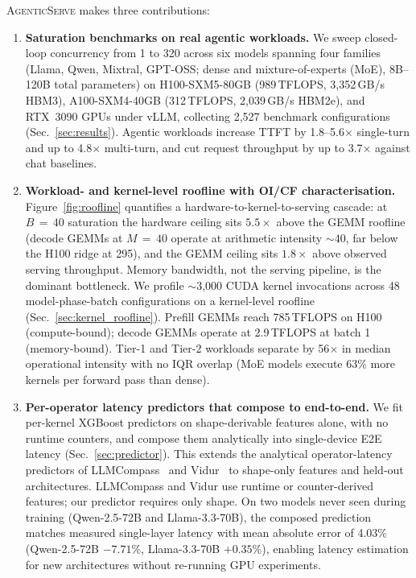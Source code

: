 \textsc{AgenticServe} makes three contributions:

\begin{enumerate}
    \item \textbf{Saturation benchmarks on real agentic workloads.} We sweep closed-loop concurrency from 1 to 320 across six models spanning four families (Llama, Qwen, Mixtral, GPT-OSS; dense and mixture-of-experts (MoE), 8B--120B total parameters) on H100-SXM5-80GB (989\,TFLOPS, 3{,}352\,GB/s HBM3), A100-SXM4-40GB (312\,TFLOPS, 2{,}039\,GB/s HBM2e), and RTX~3090 GPUs under vLLM, collecting 2{,}527 benchmark configurations (Sec.~\ref{sec:results}). Agentic workloads increase TTFT by 1.8--5.6$\times$ single-turn and up to 4.8$\times$ multi-turn, and cut request throughput by up to 3.7$\times$ against chat baselines.
    \item \textbf{Workload- and kernel-level roofline with OI/CF characterisation.} Figure~\ref{fig:roofline} quantifies a hardware-to-kernel-to-serving cascade: at $B\,{=}\,40$ saturation the hardware ceiling sits $5.5\times$ above the GEMM roofline (decode GEMMs at $M\,{=}\,40$ operate at arithmetic intensity ${\sim}40$, far below the H100 ridge at 295), and the GEMM ceiling sits $1.8\times$ above observed serving throughput. Memory bandwidth, not the serving pipeline, is the dominant bottleneck. We profile ${\sim}$3{,}000 CUDA kernel invocations across 48 model-phase-batch configurations on a kernel-level roofline (Sec.~\ref{sec:kernel_roofline}). Prefill GEMMs reach 785\,TFLOPS on H100 (compute-bound); decode GEMMs operate at 2.9\,TFLOPS at batch 1 (memory-bound). Tier-1 and Tier-2 workloads separate by 56$\times$ in median operational intensity with no IQR overlap (MoE models execute 63\% more kernels per forward pass than dense).
    \item \textbf{Per-operator latency predictors that compose to end-to-end.} We fit per-kernel XGBoost predictors on shape-derivable features alone, with no runtime counters, and compose them analytically into single-device E2E latency (Sec.~\ref{sec:predictor}). This extends the analytical operator-latency predictors of LLMCompass~\citep{llmcompass} and Vidur~\citep{vidur} to shape-only features and held-out architectures. LLMCompass and Vidur use runtime or counter-derived features; our predictor requires only shape. On two models never seen during training (Qwen-2.5-72B and Llama-3.3-70B), the composed prediction matches measured single-layer latency with mean absolute error of 4.03\% (Qwen-2.5-72B $-7.71$\%, Llama-3.3-70B $+0.35$\%), enabling latency estimation for new architectures without re-running GPU experiments.
\end{enumerate}

